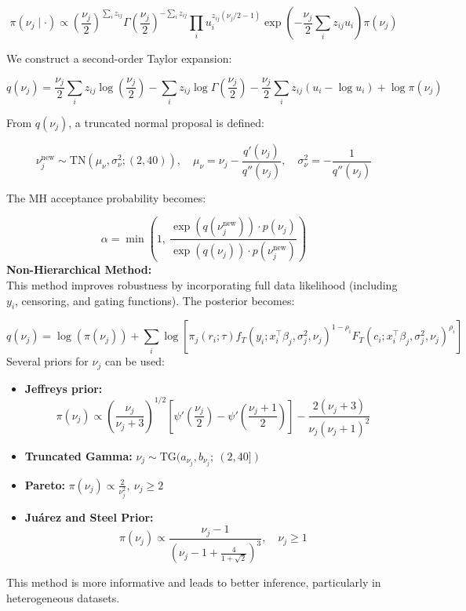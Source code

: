\documentclass[10.5pt]{article} %
\begin{document}
\[
\pi(\nu_j \mid \cdot) \propto \left(\frac{\nu_j}{2}\right)^{\sum_i z_{ij}} \Gamma\left(\frac{\nu_j}{2}\right)^{-\sum_i z_{ij}} 
\prod_i u_i^{z_{ij}(\nu_j/2 - 1)} \exp\left(-\frac{\nu_j}{2} \sum_i z_{ij} u_i\right) \pi(\nu_j)
\]

\noindent
We construct a second-order Taylor expansion:

\[
q(\nu_j) = \frac{\nu_j}{2} \sum_i z_{ij} \log \left(\frac{\nu_j}{2} \right) - \sum_i z_{ij} \log \Gamma\left( \frac{\nu_j}{2} \right) 
- \frac{\nu_j}{2} \sum_i z_{ij} \left(u_i - \log u_i \right) + \log \pi(\nu_j)
\]

\noindent
From $q(\nu_j)$, a truncated normal proposal is defined:

\[
\nu_j^{\text{new}} \sim \text{TN}(\mu_\nu, \sigma_\nu^2; (2, 40)), \quad 
\mu_\nu = \nu_j - \frac{q'(\nu_j)}{q''(\nu_j)}, \quad \sigma_\nu^2 = -\frac{1}{q''(\nu_j)}
\]

\noindent
The MH acceptance probability becomes:

\[
\alpha = \min \left( 1,\ \frac{\exp(q(\nu_j^{\text{new}})) \cdot p(\nu_j)}{\exp(q(\nu_j)) \cdot p(\nu_j^{\text{new}})} \right)
\]
\noindent
\textbf{Non-Hierarchical Method:} \\
This method improves robustness by incorporating full data likelihood (including $y_i$, censoring, and gating functions). The posterior becomes:

\[
q(\nu_j) = \log(\pi(\nu_j)) + \sum_i \log \left[ \pi_j(r_i; \tau) 
f_T(y_i; x_i^\top \beta_j, \sigma_j^2, \nu_j)^{1 - \rho_i} 
F_T(c_i; x_i^\top \beta_j, \sigma_j^2, \nu_j)^{\rho_i} \right]
\]
\noindent
Several priors for $\nu_j$ can be used:
\begin{itemize}
\item \textbf{Jeffreys prior:} 
\[
\pi(\nu_j) \propto \left( \frac{\nu_j}{\nu_j + 3} \right)^{1/2}
\left[ \psi'\left(\frac{\nu_j}{2}\right) - \psi'\left(\frac{\nu_j + 1}{2}\right) \right]
- \frac{2(\nu_j + 3)}{\nu_j(\nu_j + 1)^2}
\]
\item \textbf{Truncated Gamma:} $\nu_j \sim \text{TG}(a_{\nu_j}, b_{\nu_j};\ (2, 40])$
\item \textbf{Pareto:} $\pi(\nu_j) \propto \frac{2}{\nu_j^2},\ \nu_j \geq 2$
\item \textbf{Juárez and Steel Prior:}
\[
\pi(\nu_j) \propto \frac{\nu_j - 1}{\left(\nu_j - 1 + \frac{4}{1+\sqrt{2}} \right)^3}, \quad \nu_j \geq 1
\]
\end{itemize}

\noindent
This method is more informative and leads to better inference, particularly in heterogeneous datasets.
\end{document}
